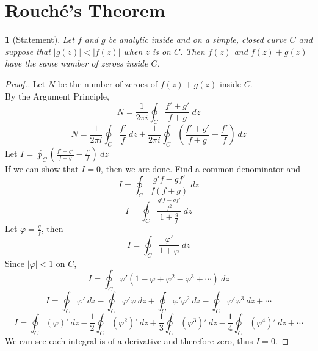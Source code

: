 \documentclass[12pt,letterpaper]{article}
\theoremstyle{named}
\newtheorem*{theorem}{}
\begin{document}
\section{Rouch\'{e}'s Theorem}
\begin{theorem}[Statement]
	Let $f$ and $g$ be analytic inside and on a simple, closed curve $C$ and suppose that
	$|g(z)| < |f(z)|$ when $z$ is on $C$.  Then $f(z)$ and $f(z) + g(z)$ have the same number
	of zeroes inside $C$.
\end{theorem}
\begin{proof}[Proof.]
Let $N$ be the number of zeroes of $f(z) + g(z)$ inside $C$.
\\By the Argument Principle,
$$ N = \frac{1}{2\pi i} \oint_C \frac{f' + g'}{f + g} ~dz $$
$$ N = \frac{1}{2\pi i} \oint_C \frac{f'}{f} ~dz + \frac{1}{2\pi i} \oint_C \left(\frac{f' + g'}{f + g} - \frac{f'}{f} \right) ~dz$$
Let $I = \oint_C \left(\frac{f' + g'}{f + g} - \frac{f'}{f} \right) ~dz$
\\If we can show that $I = 0$, then we are done.  Find a common denominator and
$$ I = \oint_C \frac{g'f - gf'}{f(f+g)} ~dz $$
$$ I = \oint_C \frac{\frac{g'f - gf'}{f^2}}{1+\frac{g}{f}} ~dz $$
Let $\varphi = \frac{g}{f}$, then
$$ I = \oint_C \frac{\varphi '}{1 + \varphi} ~dz $$
Since $|\varphi| < 1$ on $C$,
$$ I = \oint_C \varphi '(1 - \varphi + \varphi^2 - \varphi^3 + \cdots) ~dz $$
$$ I = \oint_C \varphi ' ~dz - \oint_C \varphi '\varphi ~dz +\oint_C \varphi '\varphi^2 ~dz - \oint_C \varphi '\varphi^3 ~dz + \cdots $$
$$ I = \oint_C (\varphi)' ~dz - \frac{1}{2}\oint_C (\varphi^2)' ~dz + \frac{1}{3}\oint_C (\varphi^3)' ~dz - \frac{1}{4}\oint_C (\varphi^4)' ~dz + \cdots $$
We can see each integral is of a derivative and therefore zero, thus $I = 0$.
\end{proof}

%
\end{document}
